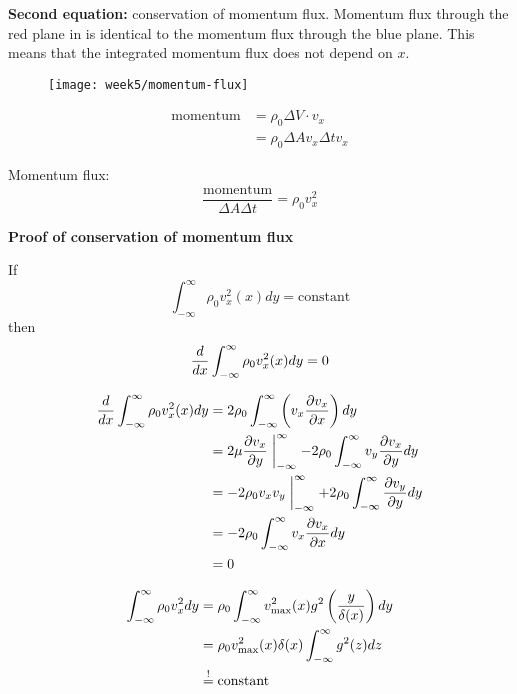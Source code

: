 \textbf{Second equation:} conservation of momentum flux.
Momentum flux through the red plane in  is identical to the momentum flux through the blue plane. This means that the integrated momentum flux does not depend on $x$.
\begin{figure}[!h]
    \centering
    \texttt{[image: week5/momentum-flux]}\\
    \caption{}
    \label{fig:momentum-flux}
\end{figure}

\begin{align}
\mathrm{momentum} & =\rho_0\Delta V\cdot v_x\\
&= \rho_0\Delta Av_x\Delta tv_x
\end{align}

Momentum flux:
\begin{equation}
\frac{\mathrm{momentum}}{\Delta A \Delta t} = \rho_0 v_x^2
\end{equation}

\noindent\makebox[\linewidth]{\rule{\textwidth}{0.5pt}}
\textbf{Proof of conservation of momentum flux}

If
\begin{equation}
\int_{-\infty}^\infty \rho_0v_x^2(x)dy=\mathrm{constant}
\end{equation}
then
\begin{equation}
\frac{d }{d x}\int_{-\infty}^\infty \rho_0v_x^2(x)dy=0
\end{equation}

\begin{align}
\frac{d }{d x}\int_{-\infty}^\infty \rho_0v_x^2(x)dy &= 2\rho_0\int_
{-\infty}^\infty\left(v_x\frac{\partial v_x}{\partial x}\right)dy \\
&= 2\mu\frac{\partial v_x}{\partial y}\biggm\vert_{-\infty}^\infty-2\rho_0\int_{-\infty}^\infty v_y\frac{\partial v_x}{\partial y}dy \\
&=-2\rho_0v_xv_y\biggm\vert_{-\infty}^\infty + 2\rho_0 \int_{-\infty}^\infty\frac{\partial v_y}{\partial y}dy \\
&= -2\rho_0\int_{-\infty}^\infty v_x\frac{\partial v_x}{\partial x}dy\\
&= 0
\end{align}
\noindent\makebox[\linewidth]{\rule{\textwidth}{0.5pt}}

\begin{align}
\int_{-\infty}^\infty\rho_0v_x^2dy &= \rho_0\int_{-\infty}^\infty v_\mathrm{max}^2(x)g^2\left(\frac{y}{\delta(x)}\right)dy\\
&= \rho_0v_\mathrm{max}^2(x)\delta(x)\int_{-\infty}^\infty g^2(z)dz\\
&\overset{!}{=} \mathrm{constant}
\end{align}

